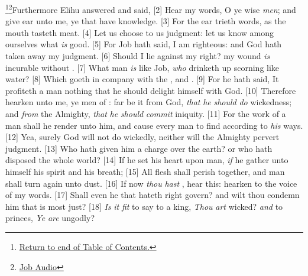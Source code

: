 \footnote{\textcolor[cmyk]{0.99998,1,0,0}{\hyperlink{TOC}{Return to end of Table of Contents.}}}\footnote{\href{https://www.audioverse.org/english/audiobibles/books/ENGKJV/O/Job/1}{\textcolor[cmyk]{0.99998,1,0,0}{Job  Audio}}}\textcolor[cmyk]{0.99998,1,0,0}{Furthermore Elihu answered and said,}
[2] \textcolor[cmyk]{0.99998,1,0,0}{Hear my words, O ye wise \emph{men}; and give ear unto me, ye that have knowledge.}
[3] \textcolor[cmyk]{0.99998,1,0,0}{For the ear trieth words, as the mouth tasteth meat.}
[4] \textcolor[cmyk]{0.99998,1,0,0}{Let us choose to us judgment: let us know among ourselves what \emph{is} good.}
[5] \textcolor[cmyk]{0.99998,1,0,0}{For Job hath said, I am righteous: and God hath taken away my judgment.}
[6] \textcolor[cmyk]{0.99998,1,0,0}{Should I lie against my right? my wound \emph{is} incurable without  .}
[7] \textcolor[cmyk]{0.99998,1,0,0}{What man \emph{is} like Job, \emph{who} drinketh up scorning like water?}
[8] \textcolor[cmyk]{0.99998,1,0,0}{Which goeth in company with the , and .}
[9] \textcolor[cmyk]{0.99998,1,0,0}{For he hath said, It profiteth a man nothing that he should delight himself with God.}
[10] \textcolor[cmyk]{0.99998,1,0,0}{Therefore hearken unto me, ye men of : far be it from God, \emph{that} \emph{he} \emph{should} \emph{do} wickedness; and \emph{from} the Almighty, \emph{that} \emph{he} \emph{should} \emph{commit} iniquity.}
[11] \textcolor[cmyk]{0.99998,1,0,0}{For the work of a man shall he render unto him, and cause every man to find according to \emph{his} ways.}
[12] \textcolor[cmyk]{0.99998,1,0,0}{Yea, surely God will not do wickedly, neither will the Almighty pervert judgment.}
[13] \textcolor[cmyk]{0.99998,1,0,0}{Who hath given him a charge over the earth? or who hath disposed the whole world?}
[14] \textcolor[cmyk]{0.99998,1,0,0}{If he set his heart upon man, \emph{if} he gather unto himself his spirit and his breath;}
[15] \textcolor[cmyk]{0.99998,1,0,0}{All flesh shall perish together, and man shall turn again unto dust.}
[16] \textcolor[cmyk]{0.99998,1,0,0}{If now \emph{thou} \emph{hast} , hear this: hearken to the voice of my words.}
[17] \textcolor[cmyk]{0.99998,1,0,0}{Shall even he that hateth right govern? and wilt thou condemn him that is most just?}
[18] \textcolor[cmyk]{0.99998,1,0,0}{\emph{Is} \emph{it} \emph{fit} to say to a king, \emph{Thou} \emph{art} wicked? \emph{and} to princes, \emph{Ye} \emph{are} ungodly?}
